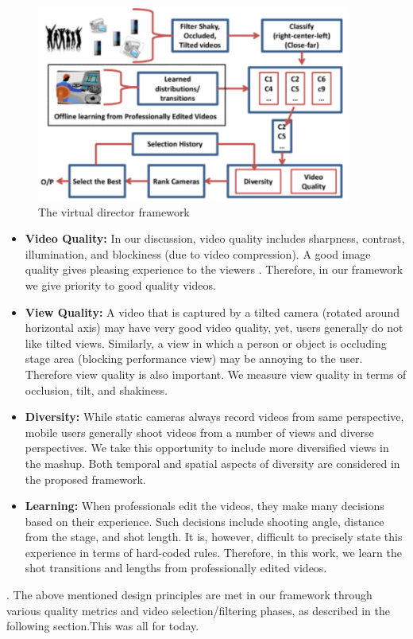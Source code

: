 \documentclass{sig-alternate-05-2015}
\begin{document}
\begin{figure}
\includegraphics[width=1\linewidth]{img2.png}
\caption{The virtual director framework}
\label{fig:block-diagram}
\end{figure}

\begin{itemize}
\item \textbf{Video Quality:} In our discussion, video quality includes
sharpness, contrast, illumination, and blockiness (due to video
compression). A good image quality gives pleasing experience to the viewers \cite{10}. Therefore, in our framework we give priority to good quality videos.

\item \textbf{View Quality:} A video that is captured by a tilted camera
(rotated around horizontal axis) may have very good video
quality, yet, users generally do not like tilted views. Similarly, a view in which a person or object is occluding stage
area (blocking performance view) may be annoying to the user. Therefore view quality is also important. We measure view quality in terms of occlusion, tilt, and shakiness.
\item \textbf{Diversity:} While static cameras always record videos from
same perspective, mobile users generally shoot videos from
a number of views and diverse perspectives. We take this
opportunity to include more diversified views in the mashup.
Both temporal and spatial aspects of diversity are considered
in the proposed framework.
\item \textbf{Learning:} When professionals edit the videos, they make
many decisions based on their experience. Such decisions
include shooting angle, distance from the stage, and shot
length. It is, however, difficult to precisely state this experience in terms of hard-coded rules. Therefore, in this work,
we learn the shot transitions and lengths from professionally
edited videos.
\end{itemize}.
The above mentioned design principles are met in our framework
through various quality metrics and video selection/filtering phases,
as described in the following section.This was all for today.
\end{document}
